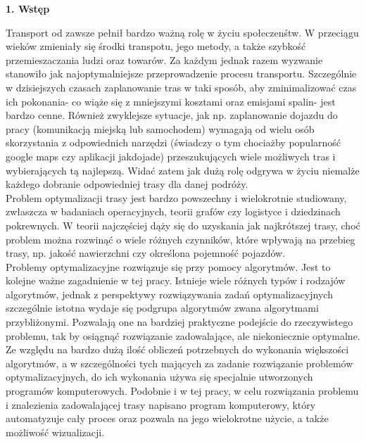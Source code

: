 \documentclass[a4paper, twoside, 12pt, justified]{article}
\begin{document}
		
	\begin{flushleft}
		\begin{LARGE}
			\textbf{1. Wstęp }
		\end{LARGE}
	\end{flushleft}
	
	\vspace{5mm} %
	
	Transport od zawsze pełnił bardzo ważną rolę w życiu społeczenśtw. W przeciągu wieków zmieniały się środki transpotu, jego metody, a także szybkość przemieszaczania ludzi oraz towarów. Za każdym jednak razem wyzwanie stanowiło jak najoptymalniejsze przeprowadzenie procesu transportu.
	Szczególnie w dzisiejszych czasach zaplanowanie tras w taki sposób, aby zminimalizować czas ich pokonania- co wiąże się z mniejszymi kosztami oraz emisjami spalin- jest bardzo cenne. Również zwyklejsze sytuacje, jak np. zaplanowanie dojazdu do pracy (komunikacją miejską lub samochodem) wymagają od wielu osób skorzystania z odpowiednich narzędzi (świadczy o tym chociażby popularność google maps czy aplikacji jakdojade) przeszukujących wiele możliwych tras i wybierających tą najlepszą. Widać zatem jak dużą rolę odgrywa w życiu niemalże każdego dobranie odpowiedniej trasy dla danej podróży.\\ 
	
	Problem optymalizacji trasy jest bardzo powszechny i wielokrotnie studiowany, zwłaszcza w badaniach operacyjnych, teorii grafów czy logistyce i dziedzinach pokrewnych. W teorii najczęściej dąży się do uzyskania jak najkrótszej trasy, choć problem można rozwinąć o wiele różnych czynników, które wpływają na przebieg trasy, np. jakość nawierzchni czy określona pojemność pojazdów.\\
	
	Problemy optymalizacyjne rozwiązuje się przy pomocy algorytmów. Jest to kolejne ważne zagadnienie w tej pracy. Istnieje wiele różnych typów i rodzajów algorytmów, jednak z perspektywy rozwiązywania zadań optymalizacyjnych szczególnie istotna wydaje się podgrupa algorytmów zwana algorytmami przybliżonymi. Pozwalają one na bardziej praktyczne podejście do rzeczywistego problemu, tak by osiągnąć rozwiązanie zadowalające, ale niekoniecznie optymalne.
	Ze względu na bardzo dużą ilość obliczeń potrzebnych do wykonania większości algorytmów, a w szczególności tych mających za zadanie rozwiązanie problemów optymalizacyjnych, do ich wykonania używa się specjalnie utworzonych programów komputerowych. Podobnie i w tej pracy, w celu rozwiązania problemu i znalezienia zadowalającej trasy napisano program komputerowy, który automatyzuje cały proces oraz pozwala na jego wielokrotne użycie, a także możliwość wizualizacji.\\ 
	
\end{document}
